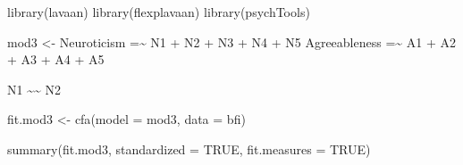 \documentclass[
  letterpaper,
  DIV=11,
  numbers=noendperiod]{scrreprt}
\newenvironment{Shaded}{\begin{snugshade}}{\end{snugshade}}
\newcommand{\AttributeTok}[1]{\textcolor[rgb]{0.40,0.45,0.13}{#1}}
\newcommand{\ConstantTok}[1]{\textcolor[rgb]{0.56,0.35,0.01}{#1}}
\newcommand{\FunctionTok}[1]{\textcolor[rgb]{0.28,0.35,0.67}{#1}}
\newcommand{\NormalTok}[1]{\textcolor[rgb]{0.00,0.23,0.31}{#1}}
\newcommand{\OtherTok}[1]{\textcolor[rgb]{0.00,0.23,0.31}{#1}}
\newcommand{\StringTok}[1]{\textcolor[rgb]{0.13,0.47,0.30}{#1}}
\begin{document}
\begin{Shaded}
\begin{Highlighting}[]
\FunctionTok{library}\NormalTok{(lavaan)}
\FunctionTok{library}\NormalTok{(flexplavaan)}
\FunctionTok{library}\NormalTok{(psychTools)}


\NormalTok{mod3 }\OtherTok{\textless{}{-}} \StringTok{\textquotesingle{}}
\StringTok{Neuroticism   =\textasciitilde{} N1 + N2 + N3 + N4 + N5}
\StringTok{Agreeableness =\textasciitilde{} A1 + A2 + A3 + A4 + A5}

\StringTok{N1 \textasciitilde{}\textasciitilde{} N2}
\StringTok{\textquotesingle{}}

\NormalTok{fit.mod3 }\OtherTok{\textless{}{-}} \FunctionTok{cfa}\NormalTok{(}\AttributeTok{model =}\NormalTok{ mod3, }
                \AttributeTok{data  =}\NormalTok{ bfi)}

\FunctionTok{summary}\NormalTok{(fit.mod3, }
        \AttributeTok{standardized =} \ConstantTok{TRUE}\NormalTok{, }
        \AttributeTok{fit.measures =} \ConstantTok{TRUE}\NormalTok{)}
\end{Highlighting}
\end{Shaded}
\end{document}
